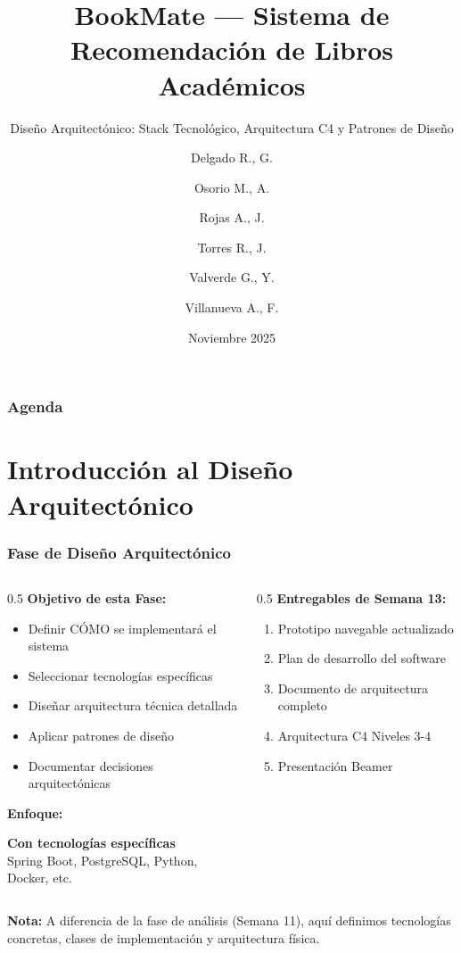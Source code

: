\documentclass[aspectratio=169]{beamer}
\title[BookMate]{BookMate — Sistema de Recomendación de Libros Académicos}
\subtitle{Diseño Arquitectónico: Stack Tecnológico, Arquitectura C4 y Patrones de Diseño}
\author[GRUPO 6]{Delgado R., G. \and Osorio M., A. \and Rojas A., J. \and Torres R., J. \and Valverde G., Y. \and Villanueva A., F.}
\institute[FC-UNI]{UNIVERSIDAD NACIONAL DE INGENIERÍA}
\date{Noviembre 2025}
\begin{document}
\begin{frame}
\titlepage
\end{frame}

\begin{frame}
\frametitle{Agenda}
\tableofcontents
\end{frame}

\section{Introducción al Diseño Arquitectónico}

\begin{frame}
\frametitle{Fase de Diseño Arquitectónico}

\begin{columns}
\begin{column}{0.5\textwidth}
\textbf{Objetivo de esta Fase:}
\begin{itemize}
\item Definir CÓMO se implementará el sistema
\item Seleccionar tecnologías específicas
\item Diseñar arquitectura técnica detallada
\item Aplicar patrones de diseño
\item Documentar decisiones arquitectónicas
\end{itemize}

\vspace{0.3cm}

\textbf{Enfoque:}
\begin{tcolorbox}[colback=green!5, colframe=green!50]
\textbf{Con tecnologías específicas}\\
Spring Boot, PostgreSQL, Python, Docker, etc.
\end{tcolorbox}
\end{column}

\begin{column}{0.5\textwidth}
\textbf{Entregables de Semana 13:}
\begin{enumerate}
\item Prototipo navegable actualizado
\item Plan de desarrollo del software
\item Documento de arquitectura completo
\item Arquitectura C4 Niveles 3-4
\item Presentación Beamer
\end{enumerate}
\end{column}
\end{columns}

\vspace{0.3cm}

\begin{tcolorbox}[colback=yellow!5, colframe=yellow!50]
\textbf{Nota:} A diferencia de la fase de análisis (Semana 11), aquí definimos tecnologías concretas, clases de implementación y arquitectura física.
\end{tcolorbox}

\end{frame}
\end{document}
